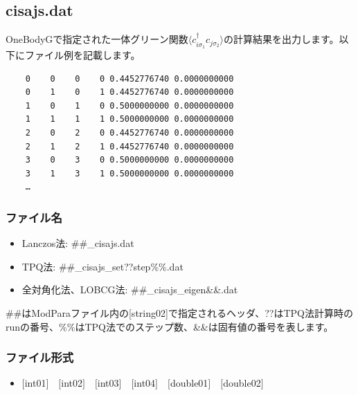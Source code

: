 \newpage
\subsection{cisajs.dat}
\label{Subsec:cgcisajs}
OneBodyGで指定された一体グリーン関数$\langle c_{i\sigma_1}^{\dagger}c_{j\sigma_2}\rangle$の計算結果を出力します。以下にファイル例を記載します。

\begin{minipage}{12.5cm}
\begin{screen}
\begin{verbatim}
    0    0    0    0 0.4452776740 0.0000000000
    0    1    0    1 0.4452776740 0.0000000000
    1    0    1    0 0.5000000000 0.0000000000
    1    1    1    1 0.5000000000 0.0000000000
    2    0    2    0 0.4452776740 0.0000000000
    2    1    2    1 0.4452776740 0.0000000000
    3    0    3    0 0.5000000000 0.0000000000
    3    1    3    1 0.5000000000 0.0000000000
    …
\end{verbatim}
\end{screen}
\end{minipage}

\subsubsection{ファイル名}
 \begin{itemize}
   \item{Lanczos法:}  \#\#\_cisajs.dat
   \item{TPQ法:} \#\#\_cisajs\_set??step\%\%.dat
   \item{全対角化法、LOBCG法:}  \#\#\_cisajs\_eigen{\&\&}.dat
  \end{itemize}
  \#\#はModParaファイル内の[string02]で指定されるヘッダ、??はTPQ法計算時のrunの番号、\%\%はTPQ法でのステップ数、\&\&は固有値の番号を表します。


\subsubsection{ファイル形式}
 \begin{itemize}
   \item  $[$int01$]$~~$[$int02$]$~~$[$int03$]$~~$[$int04$]$~~$[$double01$]$~~$[$double02$]$
  \end{itemize}
